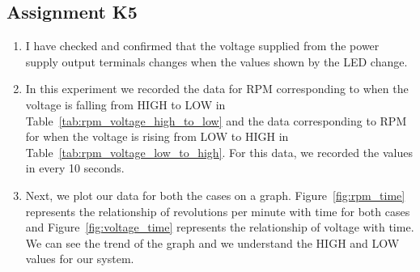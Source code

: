 \documentclass[12pt,a4paper]{report}
\begin{document}
\subsection{Assignment K5}
\begin{enumerate}
	\item I have checked and confirmed that the voltage supplied from the power supply output terminals changes when the values shown by the LED change. 
	\item In this experiment we recorded the data for RPM corresponding to when the voltage is falling from HIGH to LOW in Table~\ref{tab:rpm_voltage_high_to_low} and the data 
		corresponding to RPM for when the voltage is rising from LOW to HIGH in Table~\ref{tab:rpm_voltage_low_to_high}. For this data, we recorded the values in every 10 seconds. 
	\item Next, we plot our data for both the cases on a graph. 
		Figure~\ref{fig:rpm_time} represents the relationship of revolutions per minute with time 
		for both cases and Figure~\ref{fig:voltage_time} represents the relationship of voltage with time. 
		We can see the trend of the graph and we understand the HIGH and LOW values for our system. 
\end{enumerate}
\end{document}
